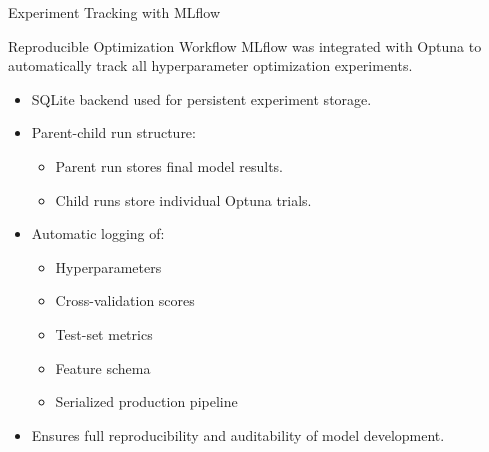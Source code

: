 \begin{frame}{Experiment Tracking with MLflow}

\begin{block}{Reproducible Optimization Workflow}
MLflow was integrated with Optuna to automatically track all
hyperparameter optimization experiments.
\end{block}

\begin{itemize}
    \item SQLite backend used for persistent experiment storage.
    
    \item Parent-child run structure:
    \begin{itemize}
        \item Parent run stores final model results.
        \item Child runs store individual Optuna trials.
    \end{itemize}

    \item Automatic logging of:
    \begin{itemize}
        \item Hyperparameters
        \item Cross-validation scores
        \item Test-set metrics
        \item Feature schema
        \item Serialized production pipeline
    \end{itemize}

    \item Ensures full reproducibility and auditability of model development.
\end{itemize}

\end{frame}
